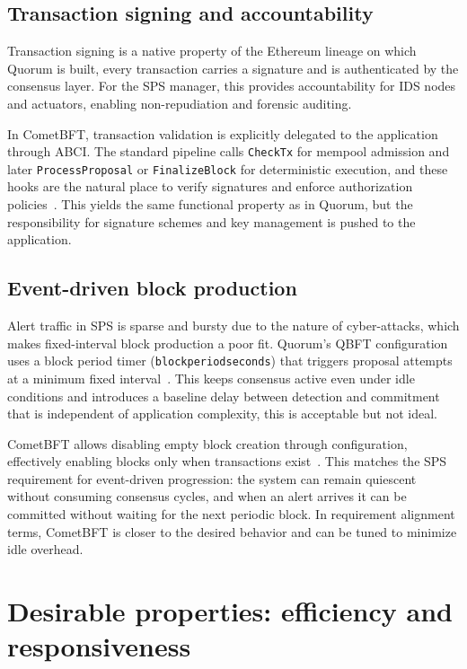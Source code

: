 \subsection{Transaction signing and accountability}
Transaction signing is a native property of the Ethereum lineage on which Quorum is built, every transaction carries a signature and is authenticated by the consensus layer. For the SPS manager, this provides accountability for IDS nodes and actuators, enabling non-repudiation and forensic auditing.

In CometBFT, transaction validation is explicitly delegated to the application through ABCI. The standard pipeline calls \texttt{CheckTx} for mempool admission and later \texttt{ProcessProposal} or \texttt{FinalizeBlock} for deterministic execution, and these hooks are the natural place to verify signatures and enforce authorization policies~\cite{abciOverview}. This yields the same functional property as in Quorum, but the responsibility for signature schemes and key management is pushed to the application.

\subsection{Event-driven block production}
Alert traffic in SPS is sparse and bursty due to the nature of cyber-attacks, which makes fixed-interval block production a poor fit. Quorum's QBFT configuration uses a block period timer (\texttt{blockperiodseconds}) that triggers proposal attempts at a minimum fixed interval~\cite{QBFTCons90:online}. This keeps consensus active even under idle conditions and introduces a baseline delay between detection and commitment that is independent of application complexity, this is acceptable but not ideal.

CometBFT allows disabling empty block creation through configuration, effectively enabling blocks only when transactions exist~\cite{cometbftConfig}. This matches the SPS requirement for event-driven progression: the system can remain quiescent without consuming consensus cycles, and when an alert arrives it can be committed without waiting for the next periodic block. In requirement alignment terms, CometBFT is closer to the desired behavior and can be tuned to minimize idle overhead.

\section{Desirable properties: efficiency and responsiveness}

